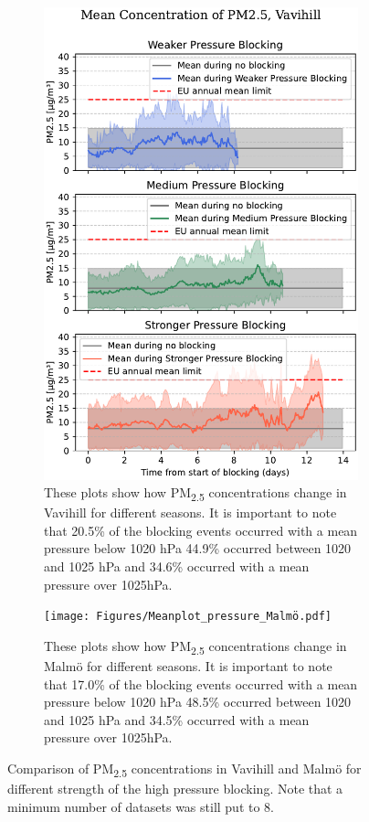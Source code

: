 \begin{figure}[H]
    \centering
    \begin{subfigure}[b]{0.49\textwidth}
        \centering
        \includegraphics[width=\textwidth]{Figures/Meanplot_pressure_Vavihill.pdf}
        \caption{These plots show how PM\textsubscript{2.5} concentrations change in Vavihill for different seasons. It is important to note that 20.5\% of the blocking events occurred with a mean pressure below 1020 hPa 44.9\% occurred between 1020 and 1025 hPa and 34.6\% occurred with a mean pressure over 1025hPa.}
        \label{fig:Meanplot_pressure_Vavihill}
    \end{subfigure}
    \hfill
    \begin{subfigure}[b]{0.49\textwidth}
        \centering
        \texttt{[image: Figures/Meanplot\_pressure\_Malmö.pdf]}
        \caption{These plots show how PM\textsubscript{2.5} concentrations change in Malmö for different seasons. It is important to note that 17.0\% of the blocking events occurred with a mean pressure below 1020 hPa 48.5\% occurred between 1020 and 1025 hPa and 34.5\% occurred with a mean pressure over 1025hPa.}
        \label{fig:Meanplot_pressure_Malmö}
    \end{subfigure}
    \caption{Comparison of PM\textsubscript{2.5} concentrations in Vavihill and Malmö for different strength of the high pressure blocking. Note that a minimum number of datasets was still put to 8. }
    \label{fig:Meanplot_pressure}
\end{figure}

